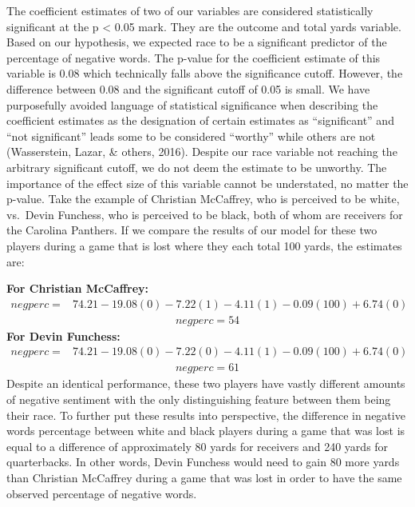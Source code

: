 \documentclass[12pt,twoside]{reedthesis}
\begin{document}
The coefficient estimates of two of our variables are considered
statistically significant at the p \textless{} 0.05 mark. They are the
outcome and total yards variable. Based on our hypothesis, we expected
race to be a significant predictor of the percentage of negative words.
The p-value for the coefficient estimate of this variable is 0.08 which
technically falls above the significance cutoff. However, the difference
between 0.08 and the significant cutoff of 0.05 is small. We have
purposefully avoided language of statistical significance when
describing the coefficient estimates as the designation of certain
estimates as ``significant'' and ``not significant'' leads some to be
considered ``worthy'' while others are not (Wasserstein, Lazar, \&
others, 2016). Despite our race variable not reaching the arbitrary
significant cutoff, we do not deem the estimate to be unworthy. The
importance of the effect size of this variable cannot be understated, no
matter the p-value. Take the example of Christian McCaffrey, who is
perceived to be white, vs.~Devin Funchess, who is perceived to be black,
both of whom are receivers for the Carolina Panthers. If we compare the
results of our model for these two players during a game that is lost
where they each total 100 yards, the estimates are:

\textbf{For Christian McCaffrey:}
\begin{align*}
{negperc} = &74.21 - 19.08(0) - 7.22(1) - 4.11(1) - 0.09(100) + 6.74(0)
\end{align*}
\begin{align*}
{negperc} = 54%
\end{align*}
\textbf{For Devin Funchess:}
\begin{align*}
{negperc} = &74.21 - 19.08(0) - 7.22(0) - 4.11(1) - 0.09(100) + 6.74(0)
\end{align*}
\begin{align*}
{negperc} = 61%
\end{align*}
Despite an identical performance, these two players have vastly
different amounts of negative sentiment with the only distinguishing
feature between them being their race. To further put these results into
perspective, the difference in negative words percentage between white
and black players during a game that was lost is equal to a difference
of approximately 80 yards for receivers and 240 yards for quarterbacks.
In other words, Devin Funchess would need to gain 80 more yards than
Christian McCaffrey during a game that was lost in order to have the
same observed percentage of negative words.
\end{document}
